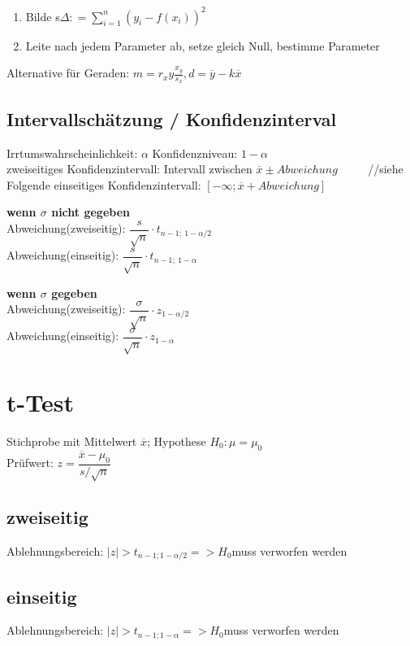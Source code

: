 \begin{enumerate}
\item Bilde s$\Delta : = \sum_{i=1}^n(y_i - f(x_i))^2$
\item Leite nach jedem Parameter ab, setze gleich Null, bestimme Parameter
\end{enumerate}

Alternative für Geraden: $m= r_xy\frac{x_y}{s_x}, d = \overline{y}-k\overline{x}$

\subsection*{Intervallschätzung / Konfidenzinterval}
Irrtumswahrscheinlichkeit: $\alpha$ 
Konfidenzniveau: $1-\alpha$\\

zweiseitiges Konfidenzintervall: Intervall zwischen $\overline{x} \pm Abweichung$ ~~~~ //siehe Folgende
einseitiges Konfidenzintervall: $[-\infty; \overline{x} + Abweichung]$

\textbf{wenn $\sigma$ nicht gegeben }\\
Abweichung(zweiseitig): $\dfrac{s}{\sqrt{n}} \cdot t_{n-1;~ 1-\alpha/2}$\\
Abweichung(einseitig): $\dfrac{s}{\sqrt{n}} \cdot t_{n-1;~ 1-\alpha}$

\textbf{wenn $\sigma$ gegeben}\\
Abweichung(zweiseitig): $\dfrac{\sigma}{\sqrt{n}}\cdot  z_{1-\alpha/2}$\\
Abweichung(einseitig): $\dfrac{\sigma}{\sqrt{n}} \cdot z_{1-\alpha}$


\section*{t-Test}
Stichprobe mit Mittelwert $\overline{x}$; Hypothese $H_0: \mu = \mu_0$\\
Prüfwert: $z= \dfrac{\overline{x} - \mu_0}{s/\sqrt{n}}$

\subsection*{zweiseitig}
Ablehnungsbereich: $|z| > t_{n-1;1-\alpha/2} => H_0 $muss verworfen werden 
\subsection*{einseitig}
Ablehnungsbereich: $|z| > t_{n-1;1-\alpha} => H_0 $muss verworfen werden 



